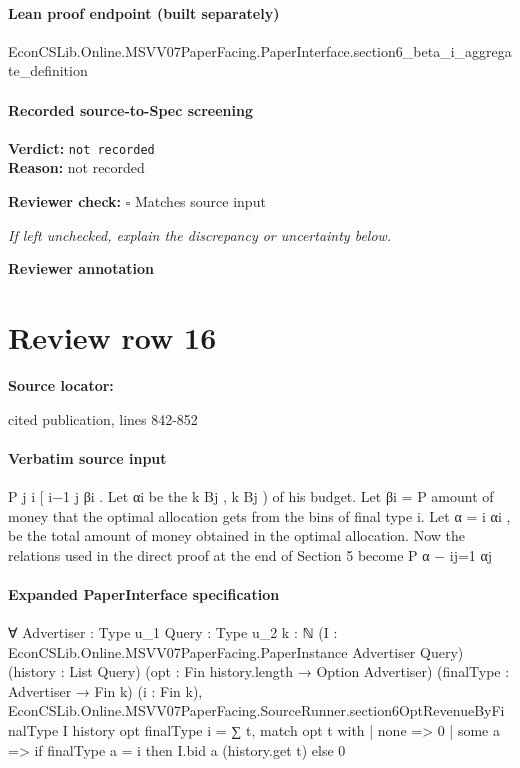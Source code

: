 \documentclass[10pt]{article}
\newcommand{\reviewerbox}{%
  \par\noindent\fbox{\parbox{0.96\linewidth}{\rule{0pt}{0.38in}}}\par
}
\newcommand{\reviewmatch}[1]{%
  \par\noindent\textbf{Reviewer check:} $\square$\; #1\par
  \noindent\emph{If left unchecked, explain the discrepancy or uncertainty below.}\par
}
\begin{document}
\paragraph{Lean proof endpoint (built separately)}\begin{ReviewVerbatim}
EconCSLib.Online.MSVV07PaperFacing.PaperInterface.section6_beta_i_aggregate_definition
\end{ReviewVerbatim}

\paragraph{Recorded source-to-Spec screening}
\textbf{Verdict:} \texttt{not recorded}
\\
\textbf{Reason:} not recorded
\reviewmatch{Matches source input}
\noindent\textbf{Reviewer annotation}\par
\reviewerbox
\clearpage
\hypertarget{source-claim-55f70a71de7bceef}{}
\section*{Review row 16}
\textbf{Source locator:} {\footnotesize\raggedright cited publication, lines 842-\allowbreak{}852\par}
\paragraph{Verbatim source input}
\begin{ReviewVerbatim}
P j
i
[ i−1
j βi . Let αi be the
k Bj , k Bj ) of his budget. Let βi =
P amount of money that the optimal
allocation gets from the bins of final type i. Let α = i αi , be the total amount of money
obtained in the optimal allocation.
Now the relations used in the direct proof at the end of Section 5 become
P
α − ij=1 αj
\end{ReviewVerbatim}


\paragraph{Expanded PaperInterface specification}
\begin{ReviewVerbatim}
∀ {Advertiser : Type u_1} {Query : Type u_2} {k : ℕ}
  (I : EconCSLib.Online.MSVV07PaperFacing.PaperInstance Advertiser Query) (history : List Query)
  (opt : Fin history.length → Option Advertiser) (finalType : Advertiser → Fin k) (i : Fin k),
  EconCSLib.Online.MSVV07PaperFacing.SourceRunner.section6OptRevenueByFinalType I history opt finalType i =
    ∑ t,
      match opt t with
      | none => 0
      | some a => if finalType a = i then I.bid a (history.get t) else 0
\end{ReviewVerbatim}
\end{document}
